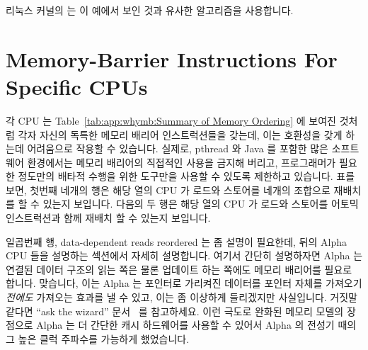 리눅스 커널의  는 이 예에서 보인 것과 유사한 알고리즘을
사용합니다.

\section{Memory-Barrier Instructions For Specific CPUs}
\label{sec:app:whymb:Memory-Barrier Instructions For Specific CPUs}

각 CPU 는 Table~\ref{tab:app:whymb:Summary of Memory Ordering} 에 보여진 것처럼
각자 자신의 독특한 메모리 배리어 인스트럭션들을 갖는데, 이는 호환성을 갖게
하는데 어려움으로 작용할 수 있습니다.
실제로, pthread 와 Java 를 포함한 많은 소프트웨어 환경에서는 메모리 배리어의
직접적인 사용을 금지해 버리고, 프로그래머가 필요한 정도만의 배타적 수행을 위한
도구만을 사용할 수 있도록 제한하고 있습니다.
표를 보면, 첫번째 네개의 행은 해당 열의 CPU 가 로드와 스토어를 네개의 조합으로
재배치를 할 수 있는지 보입니다.
다음의 두 행은 해당 열의 CPU 가 로드와 스토어를 어토믹 인스트럭션과 함께 재배치
할 수 있는지 보입니다.

일곱번째 행, data-dependent reads reordered 는 좀 설명이 필요한데, 뒤의 Alpha
CPU 들을 설명하는 섹션에서 자세히 설명합니다.
여기서 간단히 설명하자면 Alpha 는 연결된 데이터 구조의 읽는 쪽은 물론 업데이트
하는 쪽에도 메모리 배리어를 필요로 합니다.
맞습니다, 이는 Alpha 는 포인터로 가리켜진 데이터를 포인터 자체를 가져오기 {\em
전에도} 가져오는 효과를 낼 수 있고, 이는 좀 이상하게 들리겠지만 사실입니다.
거짓말 같다면 ``ask the wizard'' 문서~\cite{Compaq01} 를 참고하세요.
이런 극도로 완화된 메모리 모델의 장점으로 Alpha 는 더 간단한 캐시 하드웨어를
사용할 수 있어서 Alpha 의 전성기 때의 그 높은 클럭 주파수를 가능하게
했었습니다.
\iffalse

